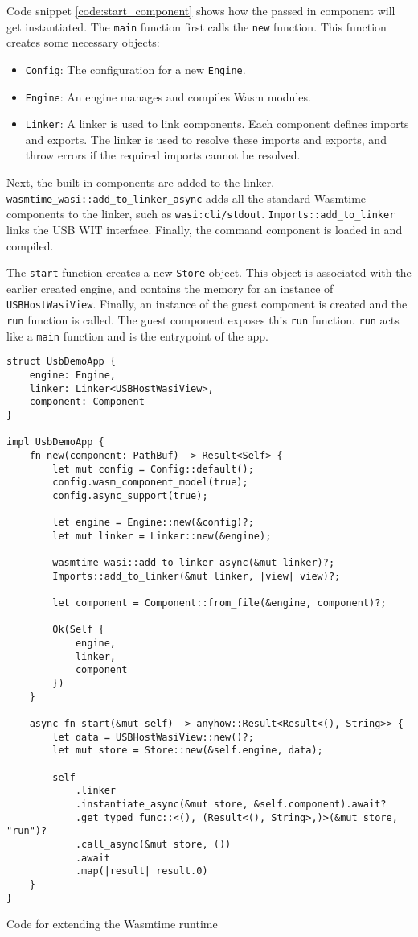 Code snippet \ref{code:start_component} shows how the passed in component will get instantiated. The \texttt{main} function first calls the \texttt{new} function. This function creates some necessary objects: 
\begin{itemize}
\item \texttt{Config}: The configuration for a new \texttt{Engine}.
\item \texttt{Engine}: An engine manages and compiles Wasm modules.
\item \texttt{Linker}: A linker is used to link components. Each component defines imports and exports. The linker is used to resolve these imports and exports, and throw errors if the required imports cannot be resolved.
\end{itemize}

Next, the built-in components are added to the linker. \texttt{wasmtime\_wasi::add\_to\_linker\_async} adds all the standard Wasmtime components to the linker, such as \texttt{wasi:cli/stdout}. \texttt{Imports::add\_to\_linker} links the USB \acrshort{WIT} interface. Finally, the command component is loaded in and compiled.

The \texttt{start} function creates a new \texttt{Store} object. This object is associated with the earlier created engine, and contains the memory for an instance of \texttt{USBHostWasiView}. Finally, an instance of the guest component is created and the \texttt{run} function is called. The guest component exposes this \texttt{run} function. \texttt{run} acts like a \texttt{main} function and is the entrypoint of the app.\\

\begin{code}
\begin{verbatim}
struct UsbDemoApp {
	engine: Engine,
	linker: Linker<USBHostWasiView>,
	component: Component
}

impl UsbDemoApp {
	fn new(component: PathBuf) -> Result<Self> {
		let mut config = Config::default();
		config.wasm_component_model(true);
		config.async_support(true);

		let engine = Engine::new(&config)?;
		let mut linker = Linker::new(&engine);

		wasmtime_wasi::add_to_linker_async(&mut linker)?;
		Imports::add_to_linker(&mut linker, |view| view)?;
		
		let component = Component::from_file(&engine, component)?;

		Ok(Self {
			engine,
			linker,
			component
		})
	}

	async fn start(&mut self) -> anyhow::Result<Result<(), String>> {
		let data = USBHostWasiView::new()?;
		let mut store = Store::new(&self.engine, data);

		self
			.linker
			.instantiate_async(&mut store, &self.component).await?
			.get_typed_func::<(), (Result<(), String>,)>(&mut store, "run")?
			.call_async(&mut store, ())
			.await
			.map(|result| result.0)
	}
}
\end{verbatim} 
\caption{Code for extending the Wasmtime runtime}
\label{code:start_component}
\end{code}

